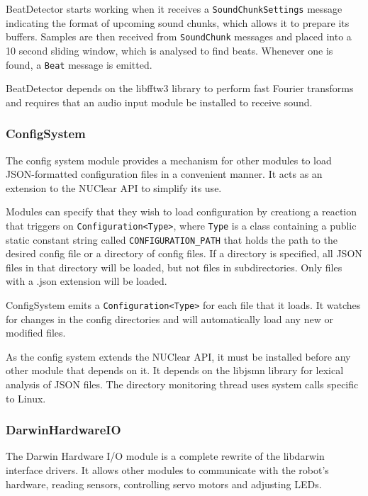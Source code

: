 \documentclass[english,12pt]{scrartcl}
\begin{document}
				BeatDetector starts working when it receives a \texttt{SoundChunkSettings} message
				indicating the format of upcoming sound chunks, which allows it to prepare its
				buffers. Samples are then received from \texttt{SoundChunk} messages and placed
				into a 10 second sliding window, which is analysed to find beats. Whenever one is
				found, a \texttt{Beat} message is emitted.
				
				BeatDetector depends on the libfftw3 library to perform fast Fourier transforms
				and requires that an audio input module be installed to receive sound.
				
				
			\subsubsection{ConfigSystem}
				The config system module provides a mechanism for other modules to load
				JSON-formatted configuration files in a convenient manner. It acts as an
				extension to the NUClear API to simplify its use.
				
				Modules can specify that they wish to load configuration by creationg a reaction
				that triggers on \texttt{Configuration<Type>}, where \texttt{Type} is a class
				containing a public static constant string called \texttt{CONFIGURATION\_PATH}
				that holds the path	to the desired config file or a directory of config files. If
				a directory is specified, all JSON files in that directory will be loaded, but
				not files in subdirectories. Only files with a .json extension will be loaded.
				
				ConfigSystem emits a \texttt{Configuration<Type>} for each file that it loads. It
				watches for changes in the config directories and will automatically load any new
				or modified files.
				
				As the config system extends the NUClear API, it must be installed before any
				other module that depends on it. It depends on the libjsmn library for lexical
				analysis of JSON files. The directory monitoring thread uses system calls
				specific to Linux.
				
				
			\subsubsection{DarwinHardwareIO}
				The Darwin Hardware I/O module is a complete rewrite of the libdarwin interface
				drivers. It allows other modules to communicate with the robot's hardware, reading
				sensors, controlling servo motors and adjusting LEDs.
				
\end{document}
